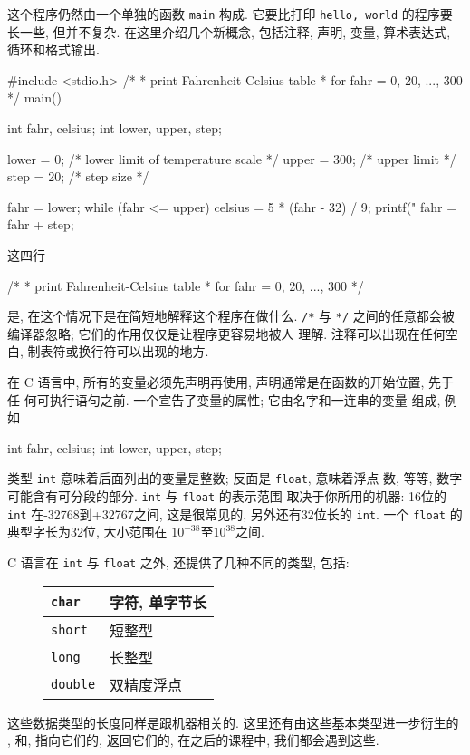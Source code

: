这个程序仍然由一个单独的函数 \verb"main" 构成. 它要比打印 \verb"hello, world"
的程序要长一些, 但并不复杂. 在这里介绍几个新概念, 包括注释, 声明, 变量, 
算术表达式, 循环和格式输出.
\begin{myverbatim}
#include <stdio.h>
/*
 * print Fahrenheit-Celsius table 
 * for fahr = 0, 20, ..., 300 
 */
 main()
 {
    int fahr, celsius;
    int lower, upper, step;

    lower   = 0;    /* lower limit of temperature scale */
    upper   = 300;  /* upper limit */
    step    = 20;   /* step size */

    fahr = lower;
    while (fahr <= upper) {
        celsius = 5 * (fahr - 32) / 9;
        printf("%
        fahr = fahr + step;
    }
 }
\end{myverbatim}


这四行
\begin{myverbatim}
/*
 * print Fahrenheit-Celsius table 
 * for fahr = 0, 20, ..., 300 
 */
\end{myverbatim}
是, 在这个情况下是在简短地解释这个程序在做什么. \verb"/*" 与
\verb"*/" 之间的任意都会被编译器忽略; 它们的作用仅仅是让程序更容易地被人
理解. 注释可以出现在任何空白, 制表符或换行符可以出现的地方.

在 C 语言中, 所有的变量必须先声明再使用, 声明通常是在函数的开始位置, 先于任
何可执行语句之前. 一个宣告了变量的属性; 它由名字和一连串的变量
组成, 例如 
\begin{myverbatim}
int fahr, celsius;
int lower, upper, step;
\end{myverbatim}
类型 \verb"int" 意味着后面列出的变量是整数; 反面是 \verb"float", 意味着浮点
数, 等等, 数字可能含有可分段的部分. \verb"int" 与 \verb"float" 的表示范围
取决于你所用的机器: 16位的 \verb"int" 在-32768到+32767之间, 这是很常见的,
另外还有32位长的 \verb"int". 一个 \verb"float" 的典型字长为32位, 大小范围在
$10^{-38}$至$10^{38}$之间.

C 语言在 \verb"int" 与 \verb"float" 之外, 还提供了几种不同的类型, 包括:
\begin{figure}[ht]
    \centering
\begin{tabular}{|l|l|}
    \hline
    \verb"char"     & 字符, 单字节长    \\ \hline
    \verb"short"    & 短整型            \\ \hline
    \verb"long"     & 长整型            \\ \hline
    \verb"double"   & 双精度浮点        \\ \hline
\end{tabular}
\end{figure}
这些数据类型的长度同样是跟机器相关的. 这里还有由这些基本类型进一步衍生的%
, 和, 指向它们的,
返回它们的, 在之后的课程中, 我们都会遇到这些.

